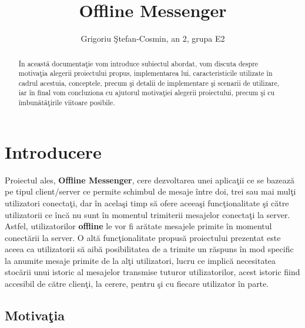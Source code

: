 \documentclass[runningheads]{llncs}
\begin{document}
\title{Offline Messenger}

\author{Grigoriu \c Stefan-Cosmin, an 2, grupa E2}




\maketitle              %

\begin{abstract}
\^ In aceast\u a documenta\c tie vom introduce subiectul abordat, vom discuta despre motiva\c tia alegerii proiectului propus, implementarea lui, caracteristicile utilizate \^ in cadrul acestuia, conceptele, precum \c si detalii de implementare \c si scenarii de utilizare, iar \^ in final vom concluziona cu ajutorul motiva\c tiei alegerii proiectului, precum \c si cu \^ imbun\u at\u a\c tirile viitoare posibile.
\end{abstract}


\section{Introducere}

Proiectul ales, {\bf Offline Messenger}, cere dezvoltarea unei aplica\c tii ce se bazeaz\u a pe tipul client/server ce permite schimbul de mesaje \^ intre doi, trei sau mai mul\c ti utilizatori conecta\c ti, dar \^ in acela\c si timp s\u a ofere aceea\c si func\c tionalitate \c si c\u atre utilizatorii ce \^ inc\u a nu sunt \^ in momentul trimiterii mesajelor conecta\c ti la server. Astfel, utilizatorilor {\bf offline} le vor fi ar\u atate mesajele primite \^ in momentul conect\u arii la server. O alt\u a func\c tionalitate propus\u a proiectului prezentat este aceea ca utilizatorii s\u a aib\u a posibilitatea de a trimite un r\u aspuns \^ in mod specific la anumite mesaje primite de la al\c ti utilizatori, lucru ce implic\u a necesitatea stoc\u arii unui istoric al mesajelor transmise tuturor utilizatorilor, acest istoric fiind accesibil de c\u atre clien\c ti, la cerere, pentru \c si cu fiecare utilizator \^ in parte.


\subsection{Motiva\c tia}
\end{document}
